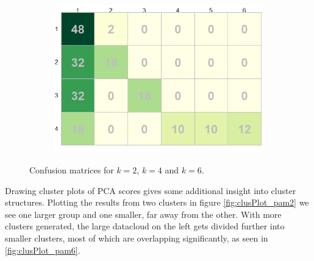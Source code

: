 \documentclass[12pt]{article}
\begin{document}
\begin{figure}[h!]
\begin{subfigure}[b]{0.33\linewidth}
 \includegraphics[width=\textwidth]{../images/project2/confMat_6.png}
 \caption{}\label{fig:confMat_6}
\end{subfigure}%
\caption{Confusion matrices for $k=2$, $k=4$ and $k=6$.}
\label{fig:confMat}
\end{figure}

Drawing cluster plots of PCA scores gives some additional insight into cluster structures. Plotting the results from two clusters in figure \ref{fig:clusPlot_pam2}
we see one larger group and one smaller, far away from the other. With more clusters generated, the large datacloud on the left gets divided further into smaller clusters, most of which are overlapping significantly, as seen in
\ref{fig:clusPlot_pam6}.
\end{document}
